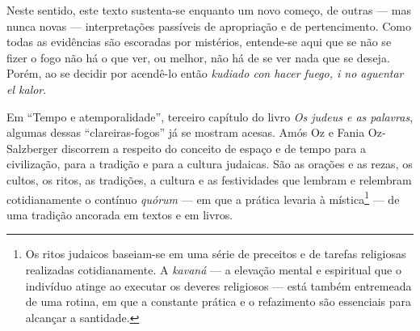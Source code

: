 Neste sentido, este texto sustenta-se enquanto um novo começo, de outras
--- mas nunca novas --- interpretações passíveis de apropriação e de
pertencimento. Como todas as evidências são escoradas por mistérios,
entende-se aqui que se não se fizer o fogo não há o que ver, ou melhor,
não há de se ver nada que se deseja. Porém, ao se decidir por acendê-lo
então \emph{kudiado con hacer fuego, i no aguentar el kalor}.

\begin{center}\end{center}

\noindent{}Em ``Tempo e atemporalidade'', terceiro capítulo do livro \emph{Os
judeus e as palavras}, algumas dessas ``clareiras-fogos'' já se mostram
acesas. Amós Oz e Fania Oz-Salzberger discorrem a respeito do conceito
de espaço e de tempo para a civilização, para a tradição e para a
cultura judaicas. São as orações e as rezas, os cultos, os ritos, as tradições,
a cultura e as festividades que lembram e relembram cotidianamente o
contínuo \emph{quórum} --- em que a prática levaria à mística\footnote{Os
  ritos judaicos baseiam-se em uma série de preceitos e de tarefas
  religiosas realizadas cotidianamente. A \emph{kavaná} --- a elevação
  mental e espiritual que o indivíduo atinge ao executar os deveres
  religiosos --- está também entremeada de uma rotina, em que a
  constante prática e o refazimento são essenciais para alcançar a
  santidade.} --- de uma tradição ancorada em textos e em livros.

